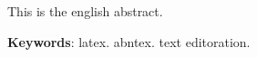 \setlength{\absparsep}{18pt} %
\begin{resumo}[Abstract]
   This is the english abstract.

   \vspace{\onelineskip}
 
   \noindent 
   \textbf{Keywords}: latex. abntex. text editoration.
\end{resumo}